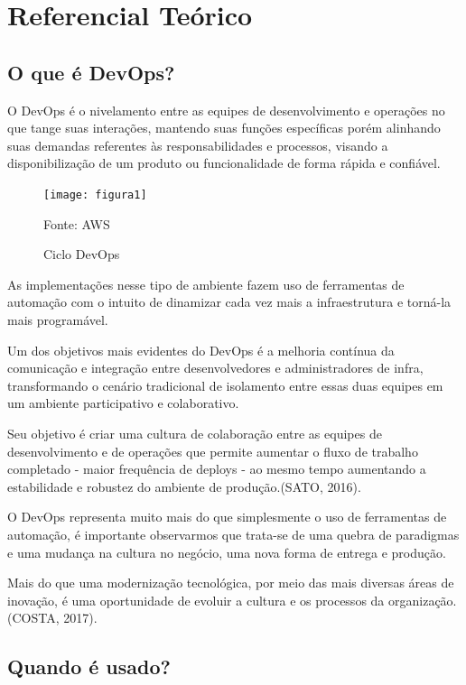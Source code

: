 

\chapter{Referencial Teórico}\label{referencial_teorico}


\section{O que é DevOps?}

O DevOps é o nivelamento entre as equipes de desenvolvimento e operações no que tange suas interações, mantendo suas funções específicas porém alinhando suas demandas referentes às responsabilidades e processos, visando a disponibilização de um produto ou funcionalidade de forma rápida e confiável.

\begin{figure}[htb] %
	\centering
	\texttt{[image: figura1]}
	\caption{Ciclo DevOps}
	Fonte: AWS
	\label{fig:figura1}
\end{figure}

As implementações nesse tipo de ambiente fazem uso de ferramentas de automação com o intuito de dinamizar cada vez mais a infraestrutura e torná-la mais programável.

Um dos objetivos mais evidentes do DevOps é a melhoria contínua da comunicação e integração entre desenvolvedores e administradores de infra, transformando o cenário tradicional de isolamento entre essas duas equipes em um ambiente participativo e colaborativo.

Seu objetivo é criar uma cultura de colaboração entre as equipes de desenvolvimento e de operações que permite aumentar o fluxo de trabalho completado - maior frequência de deploys - ao mesmo tempo aumentando a estabilidade e robustez do ambiente de produção.(SATO, 2016).

O DevOps representa muito mais do que simplesmente o uso de ferramentas de automação, é importante observarmos que trata-se de uma quebra de paradigmas e uma mudança na cultura no negócio, uma nova forma de entrega e produção.

Mais do que uma modernização tecnológica, por meio das mais diversas áreas de inovação, é uma oportunidade de evoluir a cultura e os processos da organização. (COSTA, 2017).

\section{Quando é usado?}

